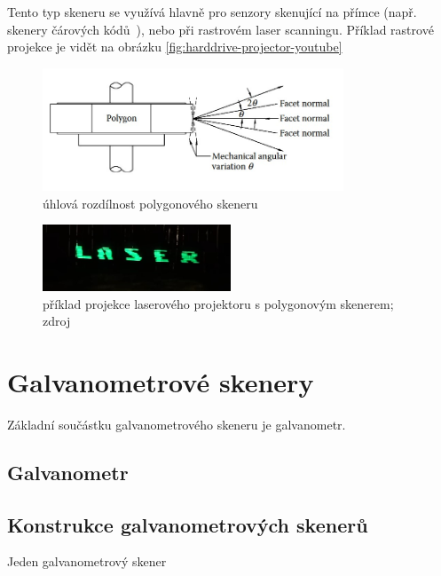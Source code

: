 Tento typ skeneru se využívá hlavně pro senzory skenující na přímce (např. skenery čárových kódů~\cite{history-of-barcode-scanning}), nebo při rastrovém laser scanningu. Příklad rastrové projekce je vidět na obrázku \ref{fig:harddrive-projector-youtube}

\begin{figure}[!htb]
  \centering
  \includegraphics[width=0.8\textwidth]{img/polygon-angular-variation.jpg}
  \caption{\label{fig:polygon-angular-variation} úhlová rozdílnost polygonového skeneru}
\end{figure}


\begin{figure}[!htb]
  \centering
  \includegraphics[width=0.5\textwidth]{img/harddrive-projection.jpg}
  \caption{\label{fig:harddrive-projection} příklad projekce laserového projektoru s polygonovým skenerem; zdroj \cite{harddrive-projector-youtube}}
\end{figure}

\section{Galvanometrové skenery}

Základní součástku galvanometrového skeneru je galvanometr.

\subsection{Galvanometr~\cite{some stuff}}

\subsection{Konstrukce galvanometrových skenerů}
Jeden galvanometrový skener 


